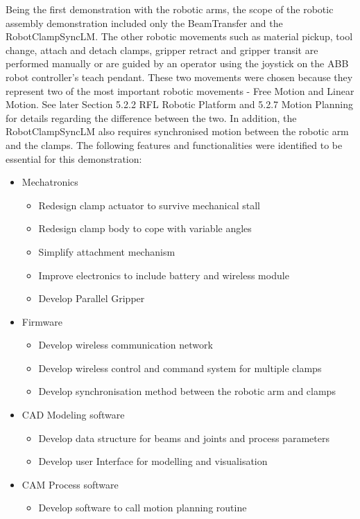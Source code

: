 Being the first demonstration with the robotic arms, the scope of the robotic assembly demonstration included only the BeamTransfer and the RobotClampSyncLM. The other robotic movements such as material pickup, tool change, attach and detach clamps, gripper retract and gripper transit are performed manually or are guided by an operator using the joystick on the ABB robot controller’s teach pendant.
These two movements were chosen because they represent two of the most important robotic movements - Free Motion and Linear Motion. See later Section 5.2.2 RFL Robotic Platform and 5.2.7 Motion Planning for details regarding the difference between the two. In addition, the RobotClampSyncLM also requires synchronised motion between the robotic arm and the clamps.
The following features and functionalities were identified to be essential for this demonstration:
\begin{itemize}
    \item Mechatronics
    \begin{itemize}
        \item Redesign clamp actuator to survive mechanical stall
        \item Redesign clamp body to cope with variable angles
        \item Simplify attachment mechanism
        \item Improve electronics to include battery and wireless module
        \item Develop Parallel Gripper
    \end{itemize}
    \item Firmware
    \begin{itemize}
        \item Develop wireless communication network
        \item Develop wireless control and command system for multiple clamps
        \item Develop synchronisation method between the robotic arm and clamps
    \end{itemize}
    \item CAD Modeling software 
        \begin{itemize}
        \item Develop data structure for beams and joints and process parameters
        \item Develop user Interface for modelling and visualisation
        \end{itemize}
    \item CAM Process software
        \begin{itemize}
        \item Develop software to call motion planning routine
        \end{itemize}
\end{itemize}

